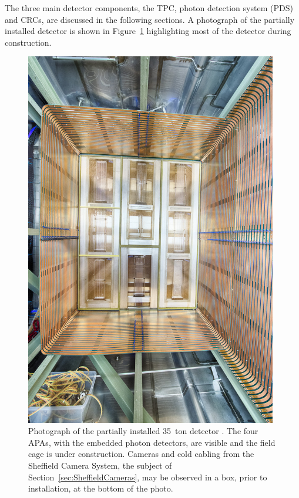 The three main detector components, the TPC, photon detection system (PDS) and CRCs, are discussed in the following sections.  A photograph of the partially installed detector is shown in Figure~\ref{fig:35tonPhoto} highlighting most of the detector during construction.

\begin{figure}
  \centering
  \includegraphics[width=11cm]{35tonPhoto.jpg}
  \caption[Photograph of the partially installed 35~ton detector.]{Photograph of the partially installed 35~ton detector \cite{VMS}.  The four APAs, with the embedded photon detectors, are visible and the field cage is under construction.  Cameras and cold cabling from the Sheffield Camera System, the subject of Section~\ref{sec:SheffieldCameras}, may be observed in a box, prior to installation, at the bottom of the photo.}
  \label{fig:35tonPhoto}
\end{figure}

